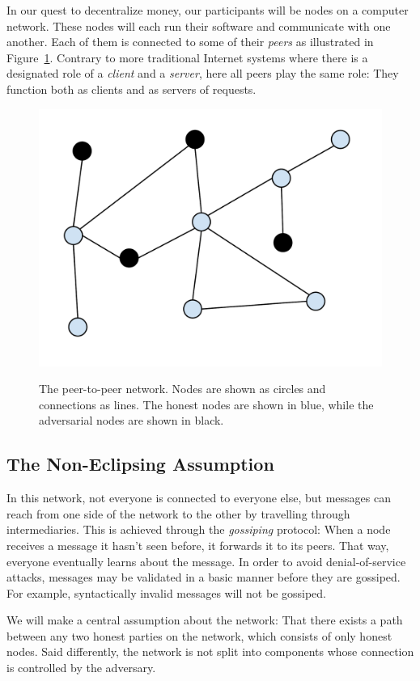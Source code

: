 In our quest to decentralize money, our participants will be nodes on a computer network.
These nodes will each run their software and communicate with one another. Each of them
is connected to some of their \emph{peers} as illustrated in Figure~\ref{fig.network}.
Contrary to more traditional Internet systems where there is a designated role of a
\emph{client} and a \emph{server}, here all peers play the same role: They function both
as clients and as servers of requests.

\begin{figure}[h]
    \centering
    \includegraphics[width=0.5 \columnwidth,keepaspectratio]{figures/peer-to-peer-network.pdf}
    \label{fig.network}
    \caption{The peer-to-peer network. Nodes are shown as circles and connections as lines.
    The honest nodes are shown in blue, while the adversarial nodes are shown in black.}
\end{figure}

\subsection*{The Non-Eclipsing Assumption}

In this network, not everyone is connected to everyone else, but messages can reach from
one side of the network to the other by travelling through intermediaries. This is achieved
through the \emph{gossiping} protocol: When a node receives a message it hasn't seen before,
it forwards it to its peers. That way, everyone eventually learns about the message. In order
to avoid denial-of-service attacks, messages may be validated in a basic manner before they
are gossiped. For example, syntactically invalid messages will not be gossiped.

We will make a central assumption about the network: That there exists a path between any two honest parties on the network, which consists of only honest nodes. Said differently, the network is not split into components whose connection is controlled by the adversary.

